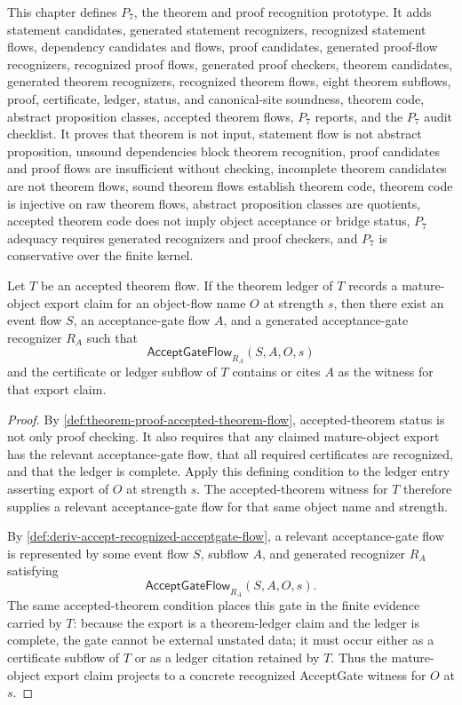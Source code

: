 \begin{remark}[Summary]
\label{rem:theorem-proof-summary}
This chapter defines $P_7$, the theorem and proof recognition prototype. It adds statement candidates, generated statement recognizers, recognized statement flows, dependency candidates and flows, proof candidates, generated proof-flow recognizers, recognized proof flows, generated proof checkers, theorem candidates, generated theorem recognizers, recognized theorem flows, eight theorem subflows, proof, certificate, ledger, status, and canonical-site soundness, theorem code, abstract proposition classes, accepted theorem flows, $P_7$ reports, and the $P_7$ audit checklist. It proves that theorem is not input, statement flow is not abstract proposition, unsound dependencies block theorem recognition, proof candidates and proof flows are insufficient without checking, incomplete theorem candidates are not theorem flows, sound theorem flows establish theorem code, theorem code is injective on raw theorem flows, abstract proposition classes are quotients, accepted theorem code does not imply object acceptance or bridge status, $P_7$ adequacy requires generated recognizers and proof checkers, and $P_7$ is conservative over the finite kernel.
\end{remark}

\begin{theorem}
\label{thm:theorem-proof-accepted-export-acceptgate-witness}
Let $T$ be an accepted theorem flow. If the theorem ledger of $T$ records a mature-object export claim for an object-flow name $O$ at strength $s$, then there exist an event flow $S$, an acceptance-gate flow $A$, and a generated acceptance-gate recognizer $R_A$ such that
$$
  \mathsf{AcceptGateFlow}_{R_A}(S,A,O,s)
$$
and the certificate or ledger subflow of $T$ contains or cites $A$ as the witness for that export claim.
\end{theorem}

\begin{proof}
By \autoref{def:theorem-proof-accepted-theorem-flow}, accepted-theorem status is not only proof checking. It also requires that any claimed mature-object export has the relevant acceptance-gate flow, that all required certificates are recognized, and that the ledger is complete. Apply this defining condition to the ledger entry asserting export of $O$ at strength $s$. The accepted-theorem witness for $T$ therefore supplies a relevant acceptance-gate flow for that same object name and strength.

By \autoref{def:deriv-accept-recognized-acceptgate-flow}, a relevant acceptance-gate flow is represented by some event flow $S$, subflow $A$, and generated recognizer $R_A$ satisfying
$$
  \mathsf{AcceptGateFlow}_{R_A}(S,A,O,s).
$$
The same accepted-theorem condition places this gate in the finite evidence carried by $T$: because the export is a theorem-ledger claim and the ledger is complete, the gate cannot be external unstated data; it must occur either as a certificate subflow of $T$ or as a ledger citation retained by $T$. Thus the mature-object export claim projects to a concrete recognized AcceptGate witness for $O$ at $s$.
\end{proof}
